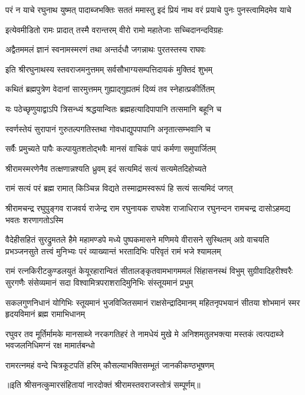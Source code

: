 \fourlineindentedshloka
{परं न याचे रघुनाथ युष्मत्}
{पादाब्जभक्तिः सततं ममास्तु}
{इदं प्रियं नाथ वरं प्रयाचे}
{पुनः पुनस्त्वामिदमेव याचे}%


\twolineshloka
{इत्येवमीडितो रामः प्रादात् तस्मै वरान्तरम्}
{वीरो रामो महातेजाः सच्चिदानन्दविग्रहः}%

\twolineshloka
{अद्वैतममलं ज्ञानं स्वनामस्मरणं तथा}
{अन्तर्दधौ जगन्नाथः पुरतस्तस्य राघवः}%

\twolineshloka
{इति श्रीरघुनाथस्य स्तवराजमनुत्तमम्}
{सर्वसौभाग्यसम्पत्तिदायकं मुक्तिदं शुभम्}%

\twolineshloka
{कथितं ब्रह्मपुत्रेण वेदानां सारमुत्तमम्}
{गुह्याद्गुह्यतमं दिव्यं तव स्नेहात्प्रकीर्तितम्}%

\twolineshloka
{यः पठेच्छृणुयाद्वाऽपि त्रिसन्ध्यं श्रद्धयान्वितः}
{ब्रह्महत्यादिपापानि तत्समानि बहूनि च}%

\twolineshloka
{स्वर्णस्तेयं सुरापानं गुरुतल्पगतिस्तथा}
{गोवधाद्युपपापानि अनृतात्सम्भवानि च}%

\twolineshloka
{सर्वैः प्रमुच्यते पापैः कल्पायुतशतोद्भवैः}
{मानसं वाचिकं पापं कर्मणा समुपार्जितम्}%

\twolineshloka
{श्रीरामस्मरणेनैव तत्क्षणान्नश्यति ध्रुवम्}
{इदं सत्यमिदं सत्यं सत्यमेतदिहोच्यते}%

\twolineshloka
{रामं सत्यं परं ब्रह्म रामात् किञ्चिन्न विद्यते}
{तस्माद्रामस्वरूपं हि सत्यं सत्यमिदं जगत्}%

\fourlineindentedshloka
{श्रीरामचन्द्र रघुपुङ्गव राजवर्य}
{राजेन्द्र राम रघुनायक राघवेश}
{राजाधिराज रघुनन्दन रामचन्द्र}
{दासोऽहमद्य भवतः शरणागतोऽस्मि}%

\fourlineindentedshloka
{वैदेहीसहितं सुरद्रुमतले हैमे महामण्डपे}
{मध्ये पुष्पकमासने मणिमये वीरासने सुस्थितम्}
{अग्रे वाचयति प्रभञ्जनसुते तत्त्वं मुनिभ्यः परं}
{व्याख्यान्तं भरतादिभिः परिवृतं रामं भजे श्यामलम्}%

\fourlineindentedshloka
{रामं रत्नकिरीटकुण्डलयुतं केयूरहारान्वितं}
{सीतालङ्कृतवामभागममलं सिंहासनस्थं विभुम्}
{सुग्रीवादिहरीश्वरैः सुरगणैः संसेव्यमानं सदा}
{विश्वामित्रपराशरादिमुनिभिः संस्तूयमानं प्रभुम्}%

\fourlineindentedshloka
{सकलगुणनिधानं योगिभिः स्तूयमानं}
{भुजविजितसमानं राक्षसेन्द्रादिमानम्}
{महितनृपभयानं सीतया शोभमानं}
{स्मर हृदयविमानं ब्रह्म रामाभिधानम्}%

\fourlineindentedshloka
{रघुवर तव मूर्तिर्मामके मानसाब्जे}
{नरकगतिहरं ते नामधेयं मुखे मे}
{अनिशमतुलभक्त्या मस्तकं त्वत्पदाब्जे}
{भवजलनिधिमग्नं रक्ष मामार्तबन्धो}%

\twolineshloka
{रामरत्नमहं वन्दे चित्रकूटपतिं हरिम्}
{कौसल्याभक्तिसम्भूतं जानकीकण्ठभूषणम्}%

॥इति श्रीसनत्कुमारसंहितायां नारदोक्तं श्रीरामस्तवराजस्तोत्रं सम्पूर्णम्॥